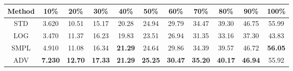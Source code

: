 \documentclass{standalone}
\begin{document}
\begin{tabular}{c|cccccccccc}
      \toprule
      Method & 10\% & 20\% & 30\% & 40\% & 50\% & 60\% & 70\% & 80\% & 90\% & 100\% \\
      \midrule
STD & 3.620 & 10.51 & 15.17 & 20.28 & 24.94 & 29.79 & 34.47 & 39.30 & 46.75 & 55.99\\
LOG & 3.470 & 11.37 & 16.23 & 19.83 & 23.51 & 26.94 & 31.35 & 33.16 & 37.30 & 43.83\\
SMPL & 4.910 & 11.08 & 16.34 & \textbf{21.29} & 24.64 & 29.86 & 34.39 & 39.57 & 46.72 & \textbf{56.05}\\
ADV & \textbf{7.230} & \textbf{12.70} & \textbf{17.33} & \textbf{21.29} & \textbf{25.25} & \textbf{30.47} & \textbf{35.20} & \textbf{40.17} & \textbf{46.94} & 55.92\\
  \bottomrule
\end{tabular}
\end{document}
